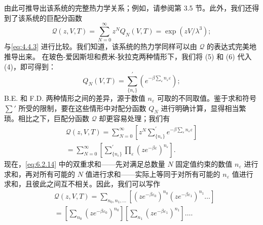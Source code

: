由此可推导出该系统的完整热力学关系；例如，请参阅第 3.5 节。此外，我们还得到了该系统的巨配分函数
\begin{equation}\tag{6.2.12}\label{eq:6.2.12}
\mathcal { Q } ( z , V , T ) = \sum _ { N = 0 } ^{\infty} z ^{N} Q _ { N } ( V , T ) = \exp ( z V / \lambda ^{3} ) ;
\end{equation}
与\autoref{eq:4.4.3} 进行比较。我们知道，该系统的热力学同样可以由 \(\mathcal{Q}\) 的表达式完美地推导出来。
在玻色-爱因斯坦和费米-狄拉克两种情形下，我们将 (5) 和 (6) 代入 (4)，即可得到：
\begin{equation}\tag{6.2.13}\label{eq:6.2.13}
Q _ { N } ( V , T ) = \sum _ { \{ n _ { \varepsilon } \} } ^{\prime} \left( e ^{- \beta \sum _ { \varepsilon} n _ { \varepsilon } \varepsilon } \right) ;
\end{equation}
B.E. 和 F.D. 两种情形之间的差异，源于数值 \(n_{\varepsilon}\) 可取的不同取值。鉴于求和符号 \(\sum'\) 所受的限制，要在这些情形中对配分函数 \(Q_{N}\) 进行明确计算，显得相当繁琐。相比之下，巨配分函数 \(\mathcal{Q}\) 却更容易处理；我们有
\begin{equation}\tag{6.2.14}\label{eq:6.2.14}
\begin{array}{r} { \mathcal { Q } ( z , V , T ) = \displaystyle \sum _ { N = 0 } ^{\infty} \left[ z ^{N} \sum _ { \{ n _ { \varepsilon } \} } ^{\prime} e ^{- \beta \sum _ { \varepsilon} n _ { \varepsilon } \varepsilon } \right] } \\{ = \displaystyle \sum _ { N = 0 } ^{\infty} \left[ \sum _ { \{ n _ { \varepsilon } \} } ^{\prime} \prod _ { \varepsilon } \left( z e ^{- \beta \varepsilon} \right) ^{n _ { \varepsilon} } \right] . } \end{array}
\end{equation}
现在，\autoref{eq:6.2.14} 中的双重求和——先对满足总数量 \(N\) 固定值约束的数值 \(n_{\varepsilon}\) 进行求和，再对所有可能的 \(N\) 值进行求和——实际上等同于对所有可能的 \(n_{\varepsilon}\) 值进行求和，且彼此之间互不相关。因此，我们可以写作
\begin{equation}\tag{6.2.15}\label{eq:6.2.15}
\begin{array}{rl} & { \mathcal { Q } ( z , V , T ) = \sum _ { n _ { 0 } , n _ { 1 } , \ldots } \left[ \left( z e ^{- \beta \varepsilon _ { 0} } \right) ^{n _ { 0} } \left( z e ^{- \beta \varepsilon _ { 1} } \right) ^{n _ { 1} } \ldots \right] } \\& {  = \left[ \sum _ { n _ { 0 } } \left( z e ^{- \beta \varepsilon _ { 0} } \right) ^{n _ { 0} } \right] \left[ \sum _ { n _ { 1 } } \left( z e ^{- \beta \varepsilon _ { 1} } \right) ^{n _ { 1} } \right] \ldots . } \end{array}
\end{equation}
